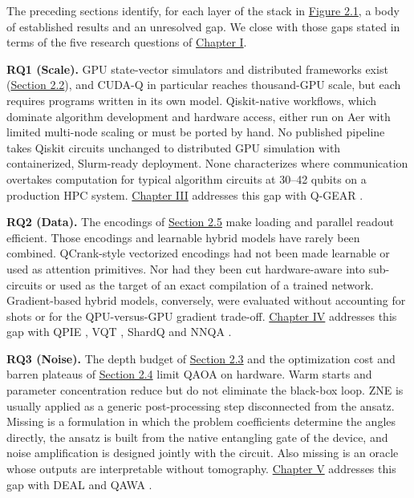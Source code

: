 \documentclass{report}
\theoremstyle{plain}
\theoremstyle{definition}
\theoremstyle{remark}
\begin{document}
The preceding sections identify, for each layer of the stack in \hyperref[fig:bg:stack]{Figure 2.1}, a body of established results and an unresolved gap. We close with those gaps stated in terms of the five research questions of \hyperref[ch:intro]{Chapter I}.

\textbf{RQ1 (Scale).} GPU state-vector simulators and distributed frameworks exist (\hyperref[sec:bg:sim]{Section 2.2}), and CUDA-Q in particular reaches thousand-GPU scale, but each requires programs written in its own model. Qiskit-native workflows, which dominate algorithm development and hardware access, either run on Aer with limited multi-node scaling or must be ported by hand. No published pipeline takes Qiskit circuits unchanged to distributed GPU simulation with containerized, Slurm-ready deployment. None characterizes where communication overtakes computation for typical algorithm circuits at 30--42 qubits on a production HPC system. \hyperref[ch:qgear]{Chapter III} addresses this gap with Q-GEAR \cite{guo2025qgear,guo2025qgearsoftware}.

\textbf{RQ2 (Data).} The encodings of \hyperref[sec:bg:encoding]{Section 2.5} make loading and parallel readout efficient. Those encodings and learnable hybrid models have rarely been combined. QCrank-style vectorized encodings had not been made learnable or used as attention primitives. Nor had they been cut hardware-aware into sub-circuits or used as the target of an exact compilation of a trained network. Gradient-based hybrid models, conversely, were evaluated without accounting for shots or for the QPU-versus-GPU gradient trade-off. \hyperref[ch:qml]{Chapter IV} addresses this gap with QPIE \cite{guo2025qpie}, VQT \cite{guo2025vqt}, ShardQ \cite{guo2025shardq} and NNQA \cite{guo2026nnqa}.

\textbf{RQ3 (Noise).} The depth budget of \hyperref[sec:bg:nisq]{Section 2.3} and the optimization cost and barren plateaus of \hyperref[sec:bg:vqa]{Section 2.4} limit QAOA on hardware. Warm starts and parameter concentration reduce but do not eliminate the black-box loop. ZNE is usually applied as a generic post-processing step disconnected from the ansatz. Missing is a formulation in which the problem coefficients determine the angles directly, the ansatz is built from the native entangling gate of the device, and noise amplification is designed jointly with the circuit. Also missing is an oracle whose outputs are interpretable without tomography. \hyperref[ch:nisq]{Chapter V} addresses this gap with DEAL \cite{guo2025deal} and QAWA \cite{guo2025qawa}.
\end{document}
